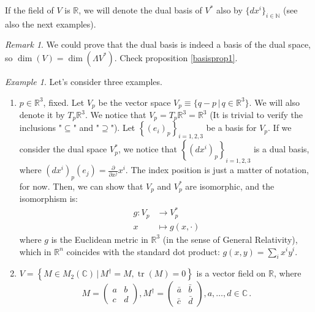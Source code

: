 \documentclass[a4paper,11pt,titlepage, article, oneside]{memoir}
\numberwithin{equation}{section}
\theoremstyle{definition}
\theoremstyle{remark}
\newtheorem{remark}[theorem]{Remark}
\newtheorem{example}[theorem]{Example}
\DeclareMathOperator{\tr}{tr}
\newcommand{\rfield}{\mathbb{R}}
\begin{document}
If the field of $V$ is $\rfield$, we will denote the dual basis of $V^*$ also by $\{dx^i\}_{i \in \mathbb{N}}$ (see also the next examples).

\begin{remarkbox}\begin{remark}
We could prove that the dual basis is indeed a basis of the dual space, so $\dim(V) = \dim(\Lambda V^*)$. Check proposition \ref{basisprop1}.
\end{remark}\end{remarkbox}

\begin{tcolorbox}\begin{example}
  Let's consider three examples.
  \begin{enumerate}
    \item $p \in \rfield^3$, fixed. Let $V_p$ be the vector space $V_p \equiv \{ q-p \,|\, q \in \rfield^3 \}$. We will also denote it by $T_p\rfield^3$. We notice that $V_p = T_p\rfield^3 = \rfield^3$ (It is trivial to verify the inclusions "$\subseteq$" and "$\supseteq$"). Let $\left \{ (e_i)_p \right \}_{i=1,2,3}$ be a basis for $V_p$. If we consider the dual space $V_p^*$, we notice that $\left \{(dx^i)_p \right\}_{i=1,2,3}$ is a dual basis, where $(dx^i)_p (e_j) = \frac{\partial}{\partial x^j} x^i$. The index position is just a matter of notation, for now. Then, we can show that $V_p$ and $V_p^*$ are isomorphic, and the isomorphism is:
    \begin{align} \label{dualisomorph}
      g \colon V_p &\rightarrow V_p^* \\
      x &\mapsto g(x, \cdot) \nonumber
    \end{align}
    where $g$ is the Euclidean metric in $\rfield^3$ (in the sense of General Relativity), which in $\rfield^n$ coincides with the standard dot product: $g(x, y) = \sum_i x^i y^i$.
    \item $V = \left \{ M \in M_2(\mathbb{C}) \, | \, M^{\dagger} = M, \tr(M) = 0 \right \}$ is a vector field on $\rfield$, where
    $$M= \left ( \begin{matrix}
    a &b \\
    c &d
  \end{matrix}\right ), M^{\dagger}= \left (\begin{matrix}
    \bar a &\bar b \\
    \bar c &\bar d
    \end{matrix} \right ), a, \ldots, d \in \mathbb{C} \, .$$


\end{enumerate}
\end{example}
\end{tcolorbox}
\end{document}
